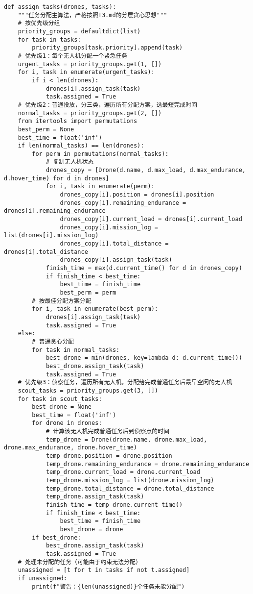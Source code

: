 \documentclass[12pt,fontset=adobe]{ctexart}
\begin{document}
\begin{verbatim}
def assign_tasks(drones, tasks):
    """任务分配主算法，严格按照T3.md的分层贪心思想"""
    # 按优先级分组
    priority_groups = defaultdict(list)
    for task in tasks:
        priority_groups[task.priority].append(task)
    # 优先级1：每个无人机分配一个紧急任务
    urgent_tasks = priority_groups.get(1, [])
    for i, task in enumerate(urgent_tasks):
        if i < len(drones):
            drones[i].assign_task(task)
            task.assigned = True
    # 优先级2：普通投放，分三类，遍历所有分配方案，选最短完成时间
    normal_tasks = priority_groups.get(2, [])
    from itertools import permutations
    best_perm = None
    best_time = float('inf')
    if len(normal_tasks) == len(drones):
        for perm in permutations(normal_tasks):
            # 复制无人机状态
            drones_copy = [Drone(d.name, d.max_load, d.max_endurance, d.hover_time) for d in drones]
            for i, task in enumerate(perm):
                drones_copy[i].position = drones[i].position
                drones_copy[i].remaining_endurance = drones[i].remaining_endurance
                drones_copy[i].current_load = drones[i].current_load
                drones_copy[i].mission_log = list(drones[i].mission_log)
                drones_copy[i].total_distance = drones[i].total_distance
                drones_copy[i].assign_task(task)
            finish_time = max(d.current_time() for d in drones_copy)
            if finish_time < best_time:
                best_time = finish_time
                best_perm = perm
        # 按最佳分配方案分配
        for i, task in enumerate(best_perm):
            drones[i].assign_task(task)
            task.assigned = True
    else:
        # 普通贪心分配
        for task in normal_tasks:
            best_drone = min(drones, key=lambda d: d.current_time())
            best_drone.assign_task(task)
            task.assigned = True
    # 优先级3：侦察任务，遍历所有无人机，分配给完成普通任务后最早空闲的无人机
    scout_tasks = priority_groups.get(3, [])
    for task in scout_tasks:
        best_drone = None
        best_time = float('inf')
        for drone in drones:
            # 计算该无人机完成普通任务后到侦察点的时间
            temp_drone = Drone(drone.name, drone.max_load, drone.max_endurance, drone.hover_time)
            temp_drone.position = drone.position
            temp_drone.remaining_endurance = drone.remaining_endurance
            temp_drone.current_load = drone.current_load
            temp_drone.mission_log = list(drone.mission_log)
            temp_drone.total_distance = drone.total_distance
            temp_drone.assign_task(task)
            finish_time = temp_drone.current_time()
            if finish_time < best_time:
                best_time = finish_time
                best_drone = drone
        if best_drone:
            best_drone.assign_task(task)
            task.assigned = True
    # 处理未分配的任务（可能由于约束无法分配）
    unassigned = [t for t in tasks if not t.assigned]
    if unassigned:
        print(f"警告：{len(unassigned)}个任务未能分配")


\end{verbatim}
\end{document}
